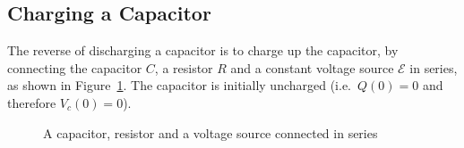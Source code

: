 \subsection{Charging a Capacitor}
The reverse of discharging a capacitor is to charge up the capacitor, by
connecting the capacitor $C$, a resistor $R$ and a constant voltage source
$\mathcal E$ in series, as shown in Figure~\ref{fig:RC2}. The capacitor is
initially uncharged (i.e.\ $Q(0)=0$ and therefore $V_c(0)=0$).

\begin{figure}[ht]
  \centering
  \caption{A capacitor, resistor and a voltage source connected in series}
  \label{fig:RC2}
\end{figure}

